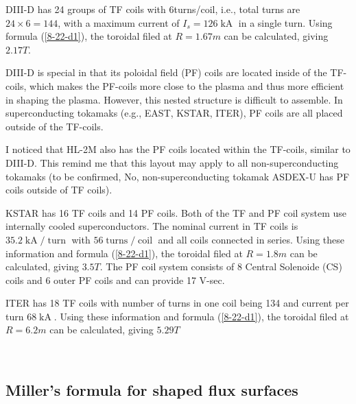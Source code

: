\documentclass{llncs}
\newcommand{\tmop}[1]{\ensuremath{\operatorname{#1}}}
\begin{document}
DIII-D has 24 groups of TF coils with 6turns/coil, i.e., total turns are $24
\times 6 = 144$, with a maximum current of $I_s = 126 \tmop{kA}$ in a single
turn{\cite{Luxon2002}}. Using formula (\ref{8-22-d1}), the toroidal filed at
$R = 1.67 m$ can be calculated, giving $2.17 T$.

DIII-D is special in that its poloidal field (PF) coils are located inside of
the TF-coils, which makes the PF-coils more close to the plasma and thus more
efficient in shaping the plasma. However, this nested structure is difficult
to assemble. In superconducting tokamaks (e.g., EAST, KSTAR, ITER), PF coils
are all placed outside of the TF-coils.

I noticed that HL-2M also has the PF coils located within the TF-coils,
similar to DIII-D. This remind me that this layout may apply to all
non-superconducting tokamaks (to be confirmed, No, non-superconducting tokamak
ASDEX-U has PF coils outside of TF coils).

KSTAR has 16 TF coils and 14 PF coils. Both of the TF and PF coil system use
internally cooled superconductors. The nominal current in TF coils is $35.2
\tmop{kA} / \tmop{turn}$ with $56 \tmop{turns} / \tmop{coil}$ and all coils
connected in series{\cite{song2007}}. Using these information and formula
(\ref{8-22-d1}), the toroidal filed at $R = 1.8 m$ can be calculated, giving
$3.5 T$. The PF coil system consists of 8 Central Solenoide (CS) coils and 6
outer PF coils and can provide 17 V-sec.

ITER has 18 TF coils with number of turns in one coil being 134 and current
per turn $68 \tmop{kA}${\cite{sborchia2008}}. Using these information and
formula (\ref{8-22-d1}), the toroidal filed at $R = 6.2 m$ can be calculated,
giving $5.29 T$

\

\subsection{Miller's formula for shaped flux surfaces}
\end{document}
